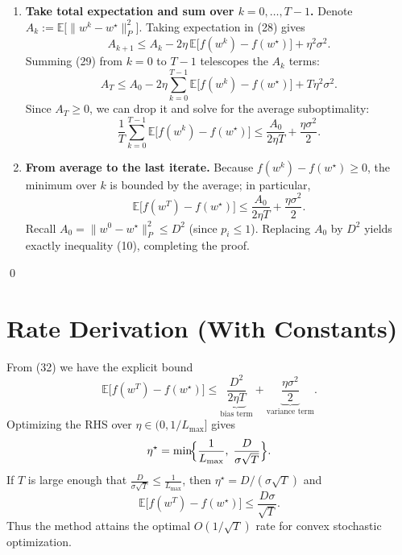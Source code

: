 \documentclass{article}
\begin{document}
\begin{enumerate}[label=[Step \arabic*]]
\item \textbf{Take total expectation and sum over $k=0,\dots,T-1$.}  
Denote $A_k:=\mathbb{E}\!\bigl[\|w^{k}-w^{\star}\|_{P}^{2}\bigr]$.
Taking expectation in (28) gives
\[
A_{k+1}\le A_{k}-2\eta\,\mathbb{E}\!\bigl[f(w^{k})-f(w^{\star})\bigr]+\eta^{2}\sigma^{2}.
\tag{29}
\]
Summing (29) from $k=0$ to $T-1$ telescopes the $A_k$ terms:
\[
A_{T}\le A_{0}-2\eta\sum_{k=0}^{T-1}\mathbb{E}\!\bigl[f(w^{k})-f(w^{\star})\bigr]+T\eta^{2}\sigma^{2}.
\tag{30}
\]
Since $A_{T}\ge 0$, we can drop it and solve for the average suboptimality:
\[
\frac{1}{T}\sum_{k=0}^{T-1}\mathbb{E}\!\bigl[f(w^{k})-f(w^{\star})\bigr]
\le \frac{A_{0}}{2\eta T}+\frac{\eta\sigma^{2}}{2}.
\tag{31}
\]

\item \textbf{From average to the last iterate.}  
Because $f(w^{k})-f(w^{\star})\ge 0$, the minimum over $k$ is bounded by the average; in particular,
\[
\mathbb{E}\!\bigl[f(w^{T})-f(w^{\star})\bigr]
\le \frac{A_{0}}{2\eta T}+\frac{\eta\sigma^{2}}{2}.
\tag{32}
\]
Recall $A_{0}=\|w^{0}-w^{\star}\|_{P}^{2}\le D^{2}$ (since $p_i\le1$).  Replacing $A_{0}$ by $D^{2}$ yields exactly inequality (10), completing the proof.
\end{enumerate}
\qed

\section*{Rate Derivation (With Constants)}
From (32) we have the explicit bound
\[
\mathbb{E}\!\bigl[f(w^{T})-f(w^{\star})\bigr]
\le \underbrace{\frac{D^{2}}{2\eta T}}_{\text{bias term}}
   +\underbrace{\frac{\eta\sigma^{2}}{2}}_{\text{variance term}}.
\]
Optimizing the RHS over $\eta\in(0,1/L_{\max}]$ gives
\[
\eta^{\star}= \min\!\Bigl\{\frac{1}{L_{\max}},\;\frac{D}{\sigma\sqrt{T}}\Bigr\}.
\]
If $T$ is large enough that $\frac{D}{\sigma\sqrt{T}}\le\frac{1}{L_{\max}}$, then $\eta^{\star}=D/(\sigma\sqrt{T})$ and
\[
\mathbb{E}\!\bigl[f(w^{T})-f(w^{\star})\bigr]
\le \frac{D\sigma}{\sqrt{T}}.
\]
Thus the method attains the optimal $O(1/\sqrt{T})$ rate for convex stochastic optimization.

\end{document}
